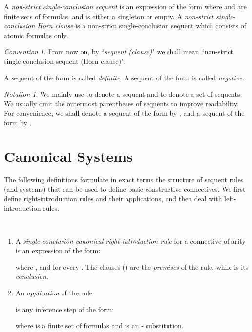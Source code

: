 \documentclass{LMCS}
\theoremstyle{remark}
\newtheorem*{notation}{Notation}
\newtheorem*{convention}{Convention}
\newcommand{\be}{\begin{enumerate}[(1)]}
\newcommand{\ee}{\end{enumerate}}
\begin{document}
\begin{defi} 
A {\em non-strict single-conclusion sequent} is an expression of the form  where
 and  are finite sets of formulas, and  is either a singleton or empty.  
A {\em non-strict single-conclusion Horn clause} is 
a non-strict single-conclusion sequent which consists of atomic formulas only.
\end{defi}

\begin{convention}
From now on, by ``{\em sequent (clause)}" we shall mean 
``non-strict single-conclusion sequent (Horn clause)".
\end{convention}

\begin{defi} 
A sequent of the form  is called {\em definite}.  
A sequent of the form  is called {\em negative}.
\end{defi}

\begin{notation}
We mainly use  to denote a sequent and  to denote a set of sequents.
We usually omit the outermost parentheses of sequents to improve readability.
For convenience, we shall denote a sequent of the form  by ,
and a sequent of the form  by .
\end{notation}

\section{Canonical Systems}

The following definitions formulate in exact terms the structure of 
sequent rules (and systems) that can be used to define basic constructive connectives.
We first define right-introduction rules and their applications, and then deal with left-introduction rules.

\begin{defi}
\label{canonical right-introduction rule}
\
\be
\item
A {\em  single-conclusion canonical right-introduction rule} for a connective  of arity 
is an expression of the form:
\begin{center}

\end{center}
\sloppy
\noindent
where
, and 
for every  .
The clauses 
 () are the {\em premises} of the rule,
while   is its {\em conclusion}. \item An {\em application} of the rule

is any inference step of the form:

where  is a finite set of formulas and  is an - substitution.
\ee
\end{defi}
\end{document}
